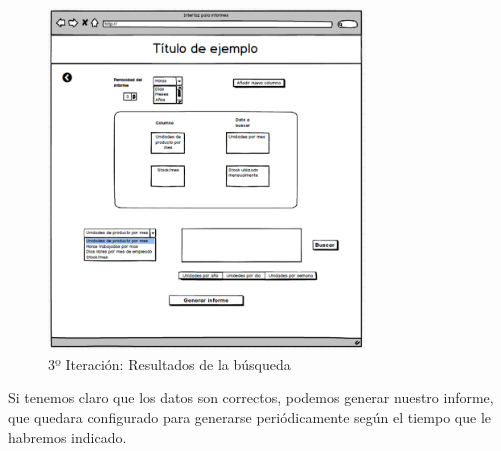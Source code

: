 \begin{figure}[hp!]
    \centering
    \includegraphics[width=0.75\textwidth]{imaxes/iteracion3.4.png}
    \caption{3º Iteración: Resultados de la búsqueda}
    \label{fig:iteracion3.4}
\end{figure}

Si tenemos claro que los datos son correctos, podemos generar nuestro informe, que quedara configurado para generarse periódicamente según el tiempo que le habremos indicado.